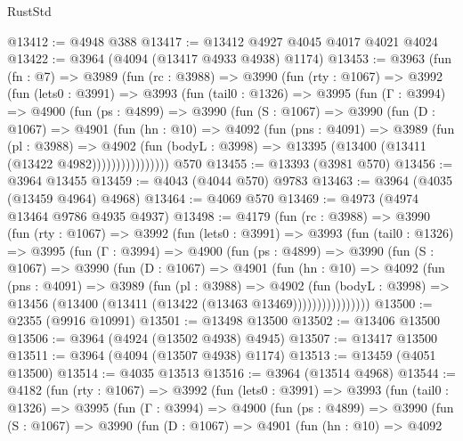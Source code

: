 \begin{lexlean}{RustStd}
\begin{coremodule}
{\begin{coremodule}
{{{{{{{{{{{{{{{{{{{{{{{{{{{{{{{{{{{{{{@13412 := @4948 @388
@13417 := @13412 @4927 @4045 @4017 @4021 @4024
@13422 := @3964 (@4094 (@13417 @4933 @4938) @1174)
@13453 := @3963
    (fun (fn : @7) =>
    @3989
      (fun (rc : @3988) =>
      @3990
        (fun (rty : @1067) =>
        @3992
          (fun (lets0 : @3991) =>
          @3993
            (fun (tail0 : @1326) =>
            @3995
              (fun (Γ : @3994) =>
              @4900
                (fun (ps : @4899) =>
                @3990
                  (fun (S : @1067) =>
                  @3990
                    (fun (D : @1067) =>
                    @4901
                      (fun (hn : @10) =>
                      @4092
                        (fun (pns : @4091) =>
                        @3989
                          (fun (pl : @3988) =>
                          @4902
                            (fun (bodyL : @3998) =>
                            @13395 (@13400 (@13411 (@13422 @4982))))))))))))))))
    @570
@13455 := @13393 (@3981 @570)
@13456 := @3964 @13455
@13459 := @4043 (@4044 @570) @9783
@13463 := @3964 (@4035 (@13459 @4964) @4968)
@13464 := @4069 @570
@13469 := @4973 (@4974 @13464 @9786 @4935 @4937)
@13498 := @4179
    (fun (rc : @3988) =>
    @3990
      (fun (rty : @1067) =>
      @3992
        (fun (lets0 : @3991) =>
        @3993
          (fun (tail0 : @1326) =>
          @3995
            (fun (Γ : @3994) =>
            @4900
              (fun (ps : @4899) =>
              @3990
                (fun (S : @1067) =>
                @3990
                  (fun (D : @1067) =>
                  @4901
                    (fun (hn : @10) =>
                    @4092
                      (fun (pns : @4091) =>
                      @3989
                        (fun (pl : @3988) =>
                        @4902
                          (fun (bodyL : @3998) =>
                          @13456 (@13400 (@13411 (@13422 (@13463 @13469))))))))))))))))
@13500 := @2355 (@9916 @10991)
@13501 := @13498 @13500
@13502 := @13406 @13500
@13506 := @3964 (@4924 (@13502 @4938) @4945)
@13507 := @13417 @13500
@13511 := @3964 (@4094 (@13507 @4938) @1174)
@13513 := @13459 (@4051 @13500)
@13514 := @4035 @13513
@13516 := @3964 (@13514 @4968)
@13544 := @4182
    (fun (rty : @1067) =>
    @3992
      (fun (lets0 : @3991) =>
      @3993
        (fun (tail0 : @1326) =>
        @3995
          (fun (Γ : @3994) =>
          @4900
            (fun (ps : @4899) =>
            @3990
              (fun (S : @1067) =>
              @3990
                (fun (D : @1067) =>
                @4901
                  (fun (hn : @10) =>
                  @4092
}}}}}}}}}}}}}}}}}}}}}}}}}}}}}}}}}}}}}}
\end{coremodule}}
\end{coremodule}
\end{lexlean}
